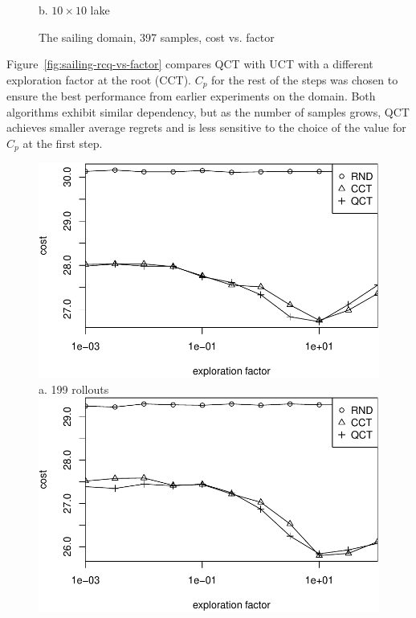 \documentclass{article}
\begin{document}
\begin{figure}[t]
\begin{minipage}[b]{0.333\linewidth}
    b. $10\times 10$ lake
  \end{minipage}
  \caption{The sailing domain, 397 samples, cost vs. factor}
  \label{fig:sailing-lake-size}
\end{figure}

Figure~\ref{fig:sailing-rcq-vs-factor} compares QCT with UCT with a
different exploration factor at the root (CCT). $C_p$ for the rest of
the steps was chosen to ensure the best performance from earlier
experiments on the domain. Both algorithms exhibit similar dependency,
but as the number of samples grows, QCT achieves smaller average
regrets and is less sensitive to the choice of the value for $C_p$ at
the first step.

\begin{figure}[t]
  \begin{minipage}[b]{0.5\linewidth}
    \centering
    \includegraphics[scale=0.45]{rcq-size=6-nsamples=199.pdf}\\
    a. 199 rollouts\\
    \vspace{1em}
    \includegraphics[scale=0.45]{rcq-size=6-nsamples=397.pdf}\\

\end{minipage}
\end{figure}
\end{document}
